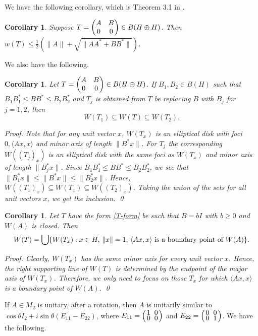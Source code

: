 \documentclass[11pt]{article}
\newtheorem{corollary}[theorem]{Corollary}
\numberwithin{equation}{section}
\def\la{\langle}
\def\ra{\rangle}
\begin{document}
\medskip
We have the following corollary, which is  Theorem 3.1 in \cite{S}.
\begin{corollary}  Suppose $T = \begin{pmatrix} A & B \cr 0 & 0 \cr\end{pmatrix} \in B(H \oplus H)$.
Then $w(T) \le \frac{1}{2} (\|A\| + \sqrt{\|AA^* + BB^*\|})$.
\end{corollary}

We also have the following.

\begin{corollary} \label{2.4} Let
$T = \begin{pmatrix} A & B \cr 0 & 0 \cr\end{pmatrix} \in B(H \oplus H)$.
If $B_1, B_2\in B(H)$ such that $B_1B_1^* \le BB^* \le B_2B_2^*$ and $T_j$ is obtained
from $T$ be replacing $B$ with $B_j$ for $j = 1,2$, then
$$W(T_1) \subseteq W(T) \subseteq W(T_2).$$
\end{corollary}

\it Proof. \rm
Note that for any unit vector $x$, $W(T_x)$ is an elliptical disk with foci
$0, \la Ax,x\ra$ and minor axis of length $\|B^*x\|$. For $T_j$ the corresponding
$W((T_j)_x)$ is an elliptical disk with the same foci as $W(T_x)$ and minor axis
of length $\|B_j^*x\|$. Since $B_1B_1^* \le BB^* \le B_2 B_2^*$, we see that
$\|B_1^*x\| \le \|B^*x\| \le \|B_2^*x\|$. Hence,
$W((T_1)_x) \subseteq W(T_x) \subseteq W((T_2)_x)$.
Taking the union of the sets for all unit vectors $x$, we get the inclusion. \qed

\begin{corollary} Let $T$ have the form \eqref{T-form} be such that $B = bI$ with $b \ge 0$ and $W(A)$ is closed.
Then
$$W(T)  = \bigcup \{W(T_x): x\in H,\, \|x\|=1,\,\langle Ax,x\rangle \hbox{ is a boundary point of } W(A)\}.$$
\end{corollary}

\it Proof. \rm Clearly, $W(T_x)$ has the same minor axis for every unit vector $x$.
Hence, the right supporting line of $W(T)$ is determined by the endpoint of the major axis of $W(T_x)$.
Therefore, we only need to focus on those $T_x$ for which $\langle Ax,x\rangle$ is a boundary point of $W(A)$.
\qed

If $A\in M_2$ is unitary, after a rotation,
then $A$ is unitarily similar to $\cos\theta I_2 + i\sin\theta(E_{11}-E_{22})$, where $E_{11}=\left({\textstyle 1\atop  \textstyle 0} \ {\textstyle 0 \atop \textstyle 0}\right)$ and $E_{22}=\left({\textstyle 0\atop  \textstyle 0} \ {\textstyle 0 \atop \textstyle 1}\right)$.
We have the following.
\end{document}

